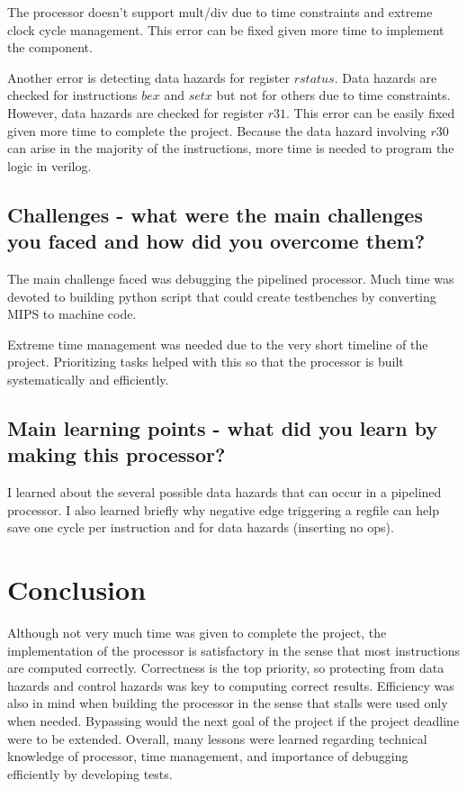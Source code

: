 \documentclass[a4paper,11pt]{article}
\begin{document}
The processor doesn't support mult/div due to time constraints and extreme clock cycle management. This error can be fixed given more time to implement the component. 

Another error is detecting data hazards for register $rstatus$. Data hazards are checked for instructions $bex$ and $setx$ but not for others due to time constraints. However, data hazards are checked for register $r31$. This error can be easily fixed given more time to complete the project. Because the data hazard involving $r30$ can arise in the majority of the instructions, more time is needed to program the logic in verilog.

\subsection*{Challenges - what were the main challenges you faced and how did you
overcome them?}

The main challenge faced was debugging the pipelined processor. Much time was devoted to building python script that could create testbenches by converting MIPS to machine code. 

Extreme time management was needed due to the very short timeline of the project. Prioritizing tasks helped with this so that the processor is built systematically and efficiently.

\subsection*{Main learning points - what did you learn by making this processor?}

I learned about the several possible data hazards that can occur in a pipelined processor. I also learned briefly why negative edge triggering a regfile can help save one cycle per instruction and for data hazards (inserting no ops).

\newpage

\section*{Conclusion}
Although not very much time was given to complete the project, the implementation of the processor is satisfactory in the sense that most instructions are computed correctly. Correctness is the top priority, so protecting from data hazards and control hazards was key to computing correct results. Efficiency was also in mind when building the processor in the sense that stalls were used only when needed. Bypassing would the next goal of the project if the project deadline were to be extended. Overall, many lessons were learned regarding technical knowledge of processor, time management, and importance of debugging efficiently by developing tests.
\end{document}
